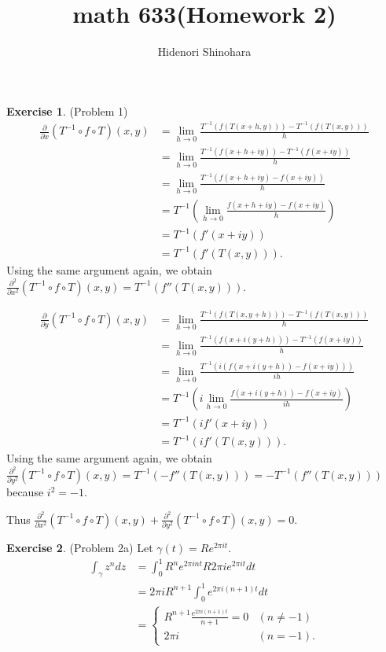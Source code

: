 \documentclass[12pt, psamsfonts]{amsart}
\theoremstyle{definition}
\newtheorem*{exer}{Exercise}
\theoremstyle{remark}
\numberwithin{equation}{section}
\begin{document}
\title{math 633(Homework 2)}
\author{Hidenori Shinohara}
\maketitle

\begin{exer}{(Problem 1)}
  \begin{align*}
    \frac{\partial}{\partial x}(T^{-1} \circ f \circ T)(x, y)
      &= \lim_{h \rightarrow 0} \frac{T^{-1}(f(T(x + h, y))) - T^{-1}(f(T(x, y)))}{h} \\
      &= \lim_{h \rightarrow 0} \frac{T^{-1}(f(x + h + iy)) - T^{-1}(f(x + iy))}{h} \\
      &= \lim_{h \rightarrow 0} \frac{T^{-1}(f(x + h + iy) - f(x + iy))}{h} \\
      &= T^{-1}(\lim_{h \rightarrow 0} \frac{f(x + h + iy) - f(x + iy)}{h}) \\
      &= T^{-1}(f'(x + iy)) \\
      &= T^{-1}(f'(T(x, y))).
  \end{align*}
  Using the same argument again, we obtain $\frac{\partial^2}{\partial x^2}(T^{-1} \circ f \circ T)(x, y) = T^{-1}(f''(T(x, y)))$.

  \begin{align*}
    \frac{\partial}{\partial y}(T^{-1} \circ f \circ T)(x, y)
      &= \lim_{h \rightarrow 0} \frac{T^{-1}(f(T(x, y + h))) - T^{-1}(f(T(x, y)))}{h} \\
      &= \lim_{h \rightarrow 0} \frac{T^{-1}(f(x + i(y + h))) - T^{-1}(f(x + iy))}{h} \\
      &= \lim_{h \rightarrow 0} \frac{T^{-1}(i(f(x + i(y + h)) - f(x + iy)))}{ih} \\
      &= T^{-1}(i\lim_{h \rightarrow 0} \frac{f(x + i(y + h)) - f(x + iy)}{ih}) \\
      &= T^{-1}(if'(x + iy)) \\
      &= T^{-1}(if'(T(x, y))).
  \end{align*}
  Using the same argument again, we obtain $\frac{\partial^2}{\partial y^2}(T^{-1} \circ f \circ T)(x, y) = T^{-1}(-f''(T(x, y))) = -T^{-1}(f''(T(x, y)))$ because $i^2 = -1$.

  Thus $\frac{\partial^2}{\partial x^2}(T^{-1} \circ f \circ T)(x, y) + \frac{\partial^2}{\partial y^2}(T^{-1} \circ f \circ T)(x, y) = 0$.

\end{exer}

\begin{exer}{(Problem 2a)}
  Let $\gamma(t) = Re^{2\pi it}$.
  \begin{align*}
    \int_{\gamma} z^ndz
      &= \int_{0}^{1} R^ne^{2\pi i nt}R2\pi ie^{2\pi it} dt \\
      &= 2\pi i R^{n + 1}\int_{0}^{1} e^{2\pi i (n + 1)t} dt \\
      &= \begin{cases}
        R^{n + 1} \frac{e^{2\pi i(n + 1)t}}{n + 1} = 0 & (n \ne -1) \\
        2\pi i & (n = -1).
      \end{cases}
  \end{align*}
\end{exer}
\end{document}
